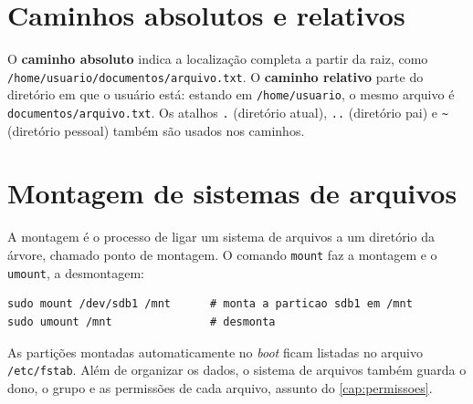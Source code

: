 \section{Caminhos absolutos e relativos}\label{sec:caminhos}

O \textbf{caminho absoluto} indica a localização completa a partir da raiz, como
\texttt{/home/usuario/documentos/arquivo.txt}. O \textbf{caminho relativo} parte do diretório
em que o usuário está: estando em \texttt{/home/usuario}, o mesmo arquivo é
\texttt{documentos/arquivo.txt}. Os atalhos \texttt{.} (diretório atual), \texttt{..}
(diretório pai) e \texttt{\textasciitilde} (diretório pessoal) também são usados nos caminhos.

\section{Montagem de sistemas de arquivos}\label{sec:montagem}

A montagem é o processo de ligar um sistema de arquivos a um diretório da árvore, chamado
ponto de montagem. O comando \texttt{mount} faz a montagem e o \texttt{umount}, a desmontagem:

\begin{lstlisting}[caption={Montagem e desmontagem de uma partição},label={lst:mount}]
sudo mount /dev/sdb1 /mnt      # monta a particao sdb1 em /mnt
sudo umount /mnt               # desmonta
\end{lstlisting}

As partições montadas automaticamente no \textit{boot} ficam listadas no arquivo
\texttt{/etc/fstab}. Além de organizar os dados, o sistema de arquivos também guarda o dono, o
grupo e as permissões de cada arquivo, assunto do \autoref{cap:permissoes}.
